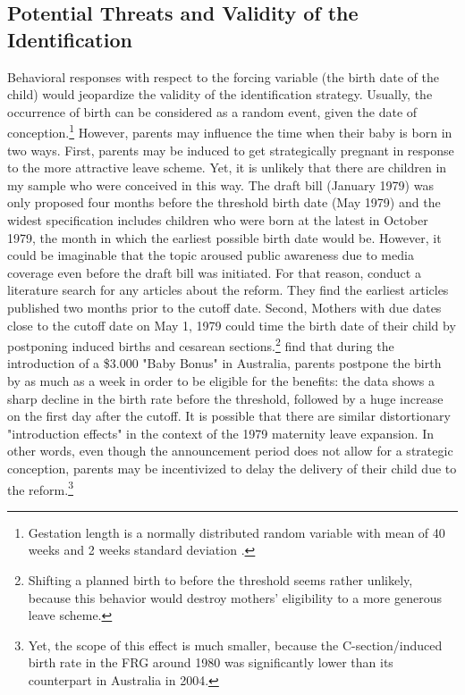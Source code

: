 \documentclass[11pt, a4paper]{article} %
\begin{document}
\subsection{Potential Threats and Validity of the Identification}\label{sec:empirical_strategy_threats+validity}
Behavioral responses with respect to the forcing variable (the birth date of the child) would jeopardize the validity of the identification strategy. Usually, the occurrence of birth can be considered as a random event, given the date of conception.\footnote{Gestation length is a normally distributed random variable with mean of 40 weeks and 2 weeks standard deviation \citep{Ekberg2013parental}.} However, parents may influence the time when their baby is born in two ways. \newline
First, parents may be induced to get strategically pregnant in response to the more attractive leave scheme. Yet, it is unlikely that there are children in my sample who were conceived in this way. The draft bill (January 1979) was only proposed four months before the threshold birth date (May 1979) and the widest specification includes children who were born at the latest in October 1979, the month in which the earliest possible birth date would be. However, it could be imaginable that the topic aroused public awareness due to media coverage even before the draft bill was initiated. For that reason, \cite{Dustmann2012} conduct a literature search for any articles about the reform. They find the earliest articles published two months prior to the cutoff date.\newline
Second, Mothers with due dates close to the cutoff date on May 1, 1979 could time the birth date of their child by postponing induced births and cesarean sections.\footnote{Shifting a planned birth to before the threshold seems rather unlikely, because this behavior would destroy mothers' eligibility to a more generous leave scheme.} \cite{gans2009born} find that during the introduction of a \$3.000 "Baby Bonus" in Australia, parents postpone the birth by as much as a week in order to be eligible for the benefits: the data shows a sharp decline in the birth rate before the threshold, followed by a huge increase on the first day after the cutoff.\newline
It is possible that there are similar distortionary "introduction effects" in the context of the 1979 maternity leave expansion. In other words, even though the announcement period does not allow for a strategic conception, parents may be incentivized to delay the delivery of their child due to the reform.\footnote{Yet, the scope of this effect is much smaller, because the C-section/induced birth rate in the FRG around 1980 was significantly lower than its counterpart in Australia in 2004.} \newline %
\end{document}
